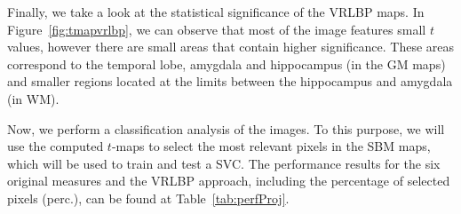 Finally, we take a look at the statistical significance of the \ac{VRLBP} maps. In Figure~\ref{fig:tmapvrlbp}, we can observe that most of the image features small $t$ values, however there are small areas that contain higher significance. These areas correspond to the temporal lobe, amygdala and hippocampus (in the \ac{GM} maps) and smaller regions located at the limits between the hippocampus and amygdala (in \ac{WM}).

Now, we perform a classification analysis of the images. To this purpose, we will use the computed $t$-maps to select the most relevant pixels in the \ac{SBM} maps, which will be used to train and test a \ac{SVC}. The performance results for the six original measures and the \ac{VRLBP} approach, including the percentage of selected pixels (perc.), can be found at Table~\ref{tab:perfProj}. 


